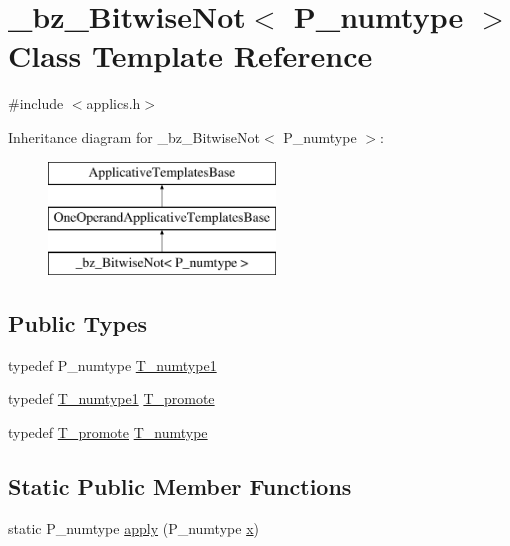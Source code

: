 \hypertarget{class__bz__BitwiseNot}{}\section{\+\_\+bz\+\_\+\+Bitwise\+Not$<$ P\+\_\+numtype $>$ Class Template Reference}
\label{class__bz__BitwiseNot}


{\ttfamily \#include $<$applics.\+h$>$}

Inheritance diagram for \+\_\+bz\+\_\+\+Bitwise\+Not$<$ P\+\_\+numtype $>$\+:\begin{figure}[H]
\begin{center}
\leavevmode
\includegraphics[height=3.000000cm]{class__bz__BitwiseNot}
\end{center}
\end{figure}
\subsection*{Public Types}
\begin{DoxyCompactItemize}
\item 
typedef P\+\_\+numtype \hyperlink{class__bz__BitwiseNot_aab2c96e74bdf626c5397d64321958c81}{T\+\_\+numtype1}
\item 
typedef \hyperlink{class__bz__BitwiseNot_aab2c96e74bdf626c5397d64321958c81}{T\+\_\+numtype1} \hyperlink{class__bz__BitwiseNot_a4200c2f96e8c801f9028fb73383ca454}{T\+\_\+promote}
\item 
typedef \hyperlink{class__bz__BitwiseNot_a4200c2f96e8c801f9028fb73383ca454}{T\+\_\+promote} \hyperlink{class__bz__BitwiseNot_afbdc61fb87c4ab2ec06a2e7e18f5c293}{T\+\_\+numtype}
\end{DoxyCompactItemize}
\subsection*{Static Public Member Functions}
\begin{DoxyCompactItemize}
\item 
static P\+\_\+numtype \hyperlink{class__bz__BitwiseNot_a135f233a80c47beb88ed42fb8ac5c407}{apply} (P\+\_\+numtype \hyperlink{vecnorm1_8cc_ac73eed9e41ec09d58f112f06c2d6cb63}{x})
\end{DoxyCompactItemize}


